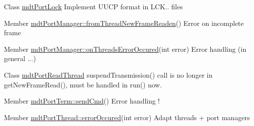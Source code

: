 \begin{DoxyDescription}
\item[Class \hyperlink{classmdt_port_lock}{mdtPortLock} ]Implement UUCP format in LCK.. files 
\end{DoxyDescription}

\label{todo__todo000026}
\hypertarget{todo__todo000026}{}
 
\begin{DoxyDescription}
\item[Member \hyperlink{classmdt_port_manager_a4fcc8f0699b655156e661bb3de6056cc}{mdtPortManager::fromThreadNewFrameReaden}() ]Error on incomplete frame 
\end{DoxyDescription}

\label{todo__todo000027}
\hypertarget{todo__todo000027}{}
 
\begin{DoxyDescription}
\item[Member \hyperlink{classmdt_port_manager_a7e45b8e3475e5182ed12218616664d07}{mdtPortManager::onThreadsErrorOccured}(int error) ]Error handling (in general ...) 
\end{DoxyDescription}

\label{todo__todo000028}
\hypertarget{todo__todo000028}{}
 
\begin{DoxyDescription}
\item[Class \hyperlink{classmdt_port_read_thread}{mdtPortReadThread} ]suspendTransmission() call is no longer in getNewFrameRead(), must be handled in run() now. 
\end{DoxyDescription}

\label{todo__todo000051}
\hypertarget{todo__todo000051}{}
 
\begin{DoxyDescription}
\item[Member \hyperlink{classmdt_port_term_a7ec568c44f862fe7aee83f1a271ac6bb}{mdtPortTerm::sendCmd}() ]Error handling ! 
\end{DoxyDescription}

\label{todo__todo000029}
\hypertarget{todo__todo000029}{}
 
\begin{DoxyDescription}
\item[Member \hyperlink{classmdt_port_thread_ab31cbe1a85aa830cd368654d1f806326}{mdtPortThread::errorOccured}(int error) ]Adapt threads + port managers
\end{DoxyDescription}

\label{todo__todo000030}
\hypertarget{todo__todo000030}{}
 

